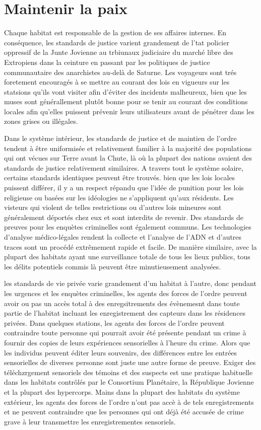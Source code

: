 \section{Maintenir la paix} \label{sec:keeping-peace} 

Chaque habitat est responsable de la gestion de ses affaires internes. En conséquence, les standards de justice varient grandement de l'tat policier oppressif de la Junte Jovienne au trbiunaux judiciaire du marché libre des Extropiens dans la ceinture en passant par les politiques de justice communautaire des anarchistes au-delà de Saturne. Les voyageurs sont trés foretement encouragés à se mettre au courant des lois en vigueurs sur les statsions qu'ils vont visiter afin d'éviter des incidents malheureux, bien que les muses sont générallement plutôt bonne pour se tenir au courant des conditions locales afin qu'elles puissent prévenir leurs utilisateurs avant de pénétrer dans les zones grises ou illégales. 

Dans le système intérieur, les standards de justice et de maintien de l'ordre tendent à être uniformisée et relativement familier à la majorité des populations qui ont vécues sur Terre avant la Chute, là où la plupart des nations avaient des standards de justice relativement similaires. A travers tout le système solaire, certains standards identiques peuvent être trouvés. bien que les lois locales puissent différer, il y a un respect répandu que l'idée de punition pour les lois religieuse ou basées sur les idéologies ne s'appliquent qu'aux résidents. Les visteurs qui violent de telles restrictions ou d'autres lois mineures sont généralement déportés chez eux et sont interdits de revenir. Des standards de preuves pour les enquètes criminelles sont également communs. Les technologies d'analyse médico-légales rendent la collecte et l'analyse de l'ADN et d'autres traces sont un procédé extrêmement rapide et facile. De manière similaire, avec la plupart des habitats ayant une surveillance totale de tous les lieux publics, tous les délits potentiels commis là peuvent être minutieusement analysées. 

les standards de vie privée varie grandement d'un habitat à l'autre, donc pendant les urgences et les enquètes criminelles, les agents des forces de l'ordre peuvent avoir ou pas un accès total à des enregsitrements des évènemesnt dans toute partie de l'habitat incluant les enregistrement des capteurs dans les résidences privées. Dans quelques stations, les agents des forces de l'ordre peuvent contraindre toute personne qui pourrait avoir été présente pendant un crime à fournir des copies de leurs expériences sensorielles à l'heure du crime. Alors que les individus peuvent éditer leurs souvenirs, des différences entre les entrées sensorielles de diverses personne sont juste une autre forme de preuve. Exiger des téléchzrgement sensoriels des témoins et des suspects est une pratique habituelle dans les habitats contrôlés par le Consortium Planétaire, la République Jovienne et la plupart des hypercorps. Mains dans la plupart des habitats du système extérieur, les agents des forces de l'ordre n'ont pas accè à de tels enregistrements et ne peuvent contraindre que les personnes qui ont déjà été accusée de crime grave à leur transmettre les enregistrementes sensoriels. 

